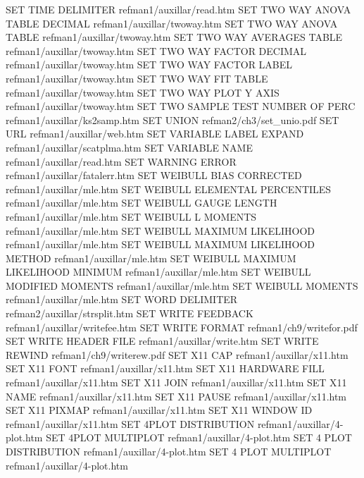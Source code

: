 SET TIME DELIMITER                      refman1/auxillar/read.htm
SET TWO WAY ANOVA TABLE DECIMAL         refman1/auxillar/twoway.htm
SET TWO WAY ANOVA TABLE                 refman1/auxillar/twoway.htm
SET TWO WAY AVERAGES TABLE              refman1/auxillar/twoway.htm
SET TWO WAY FACTOR DECIMAL              refman1/auxillar/twoway.htm
SET TWO WAY FACTOR LABEL                refman1/auxillar/twoway.htm
SET TWO WAY FIT TABLE                   refman1/auxillar/twoway.htm
SET TWO WAY PLOT Y AXIS                 refman1/auxillar/twoway.htm
SET TWO SAMPLE TEST NUMBER OF PERC      refman1/auxillar/ks2samp.htm
SET UNION                               refman2/ch3/set_unio.pdf
SET URL                                 refman1/auxillar/web.htm
SET VARIABLE LABEL EXPAND               refman1/auxillar/scatplma.htm
SET VARIABLE NAME                       refman1/auxillar/read.htm
SET WARNING ERROR                       refman1/auxillar/fatalerr.htm
SET WEIBULL BIAS CORRECTED              refman1/auxillar/mle.htm
SET WEIBULL ELEMENTAL PERCENTILES       refman1/auxillar/mle.htm
SET WEIBULL GAUGE LENGTH                refman1/auxillar/mle.htm
SET WEIBULL L MOMENTS                   refman1/auxillar/mle.htm
SET WEIBULL MAXIMUM LIKELIHOOD          refman1/auxillar/mle.htm
SET WEIBULL MAXIMUM LIKELIHOOD METHOD   refman1/auxillar/mle.htm
SET WEIBULL MAXIMUM LIKELIHOOD MINIMUM  refman1/auxillar/mle.htm
SET WEIBULL MODIFIED MOMENTS            refman1/auxillar/mle.htm
SET WEIBULL MOMENTS                     refman1/auxillar/mle.htm
SET WORD DELIMITER                      refman2/auxillar/strsplit.htm
SET WRITE FEEDBACK                      refman1/auxillar/writefee.htm
SET WRITE FORMAT                        refman1/ch9/writefor.pdf
SET WRITE HEADER FILE                   refman1/auxillar/write.htm
SET WRITE REWIND                        refman1/ch9/writerew.pdf
SET X11 CAP                             refman1/auxillar/x11.htm
SET X11 FONT                            refman1/auxillar/x11.htm
SET X11 HARDWARE FILL                   refman1/auxillar/x11.htm
SET X11 JOIN                            refman1/auxillar/x11.htm
SET X11 NAME                            refman1/auxillar/x11.htm
SET X11 PAUSE                           refman1/auxillar/x11.htm
SET X11 PIXMAP                          refman1/auxillar/x11.htm
SET X11 WINDOW ID                       refman1/auxillar/x11.htm
SET 4PLOT DISTRIBUTION                  refman1/auxillar/4-plot.htm
SET 4PLOT MULTIPLOT                     refman1/auxillar/4-plot.htm
SET 4 PLOT DISTRIBUTION                 refman1/auxillar/4-plot.htm
SET 4 PLOT MULTIPLOT                    refman1/auxillar/4-plot.htm
